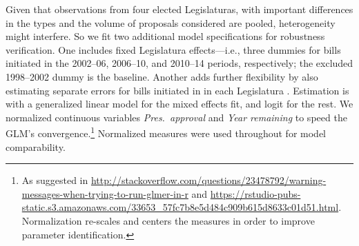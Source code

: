 \documentclass[letter,12pt]{article}
\begin{document}
Given that observations from four elected Legislaturas, with important differences in the types and the volume of proposals considered \citep{aleman.navia.UrgChi.2009} are pooled, heterogeneity might interfere. So we fit two additional model specifications for robustness verification. One includes fixed Legislatura effects---i.e., three dummies for bills initiated in the 2002--06, 2006--10, and 2010--14 periods, respectively; the excluded 1998--2002 dummy is the baseline. Another adds further flexibility by also estimating separate errors for bills initiated in in each Legislatura \citep[a so-called mixed effects model,][:262,302]{gelman.hill.2007}. Estimation is with a generalized linear model for the mixed effects fit, and logit for the rest. We normalized continuous variables \emph{Pres.~approval} and \emph{Year remaining} to speed the GLM's convergence.\footnote{As suggested in \url{http://stackoverflow.com/questions/23478792/warning-messages-when-trying-to-run-glmer-in-r} and \url{https://rstudio-pubs-static.s3.amazonaws.com/33653_57fc7b8e5d484c909b615d8633c01d51.html}. Normalization re-scales and centers the measures in order to improve parameter identification.} Normalized measures were used throughout for model comparability.

\end{document}
